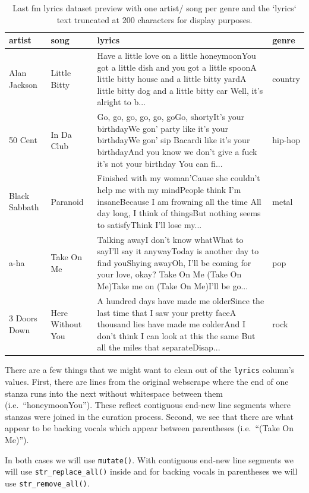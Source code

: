 \documentclass[
]{article}
\begin{document}
\begin{table}

\caption{\label{tab:td-lastfm-read-preview}Last fm lyrics dataset preview with one artist/ song per genre and the `lyrics` text truncated  at 200 characters for display purposes.}
\centering
\begin{tabular}[t]{llll}
\toprule
artist & song & lyrics & genre\\
\midrule
Alan Jackson & Little Bitty & Have a little love on a little honeymoonYou got a little dish and you got a little spoonA little bitty house and a little bitty yardA little bitty dog and a little bitty car Well, it's alright to b... & country\\
50 Cent & In Da Club & Go, go, go, go, go, goGo, shortyIt's your birthdayWe gon' party like it's your birthdayWe gon' sip Bacardi like it's your birthdayAnd you know we don't give a fuck it's not your birthday You can fi... & hip-hop\\
Black Sabbath & Paranoid & Finished with my woman'Cause she couldn't help me with my mindPeople think I'm insaneBecause I am frowning all the time All day long, I think of thingsBut nothing seems to satisfyThink I'll lose my... & metal\\
a-ha & Take On Me & Talking awayI don't know whatWhat to sayI'll say it anywayToday is another day to find youShying awayOh, I'll be coming for your love, okay? Take On Me (Take On Me)Take me on (Take On Me)I'll be go... & pop\\
3 Doors Down & Here Without You & A hundred days have made me olderSince the last time that I saw your pretty faceA thousand lies have made me colderAnd I don't think I can look at this the same But all the miles that separateDisap... & rock\\
\bottomrule
\end{tabular}
\end{table}

There are a few things that we might want to clean out of the \texttt{lyrics} column's values. First, there are lines from the original webscrape where the end of one stanza runs into the next without whitespace between them (i.e.~``honeymoonYou''). These reflect contiguous end-new line segments where stanzas were joined in the curation process. Second, we see that there are what appear to be backing vocals which appear between parentheses (i.e.~``(Take On Me)'').

In both cases we will use \texttt{mutate()}. With contiguous end-new line segments we will use \texttt{str\_replace\_all()} inside and for backing vocals in parentheses we will use \texttt{str\_remove\_all()}.
\end{document}
